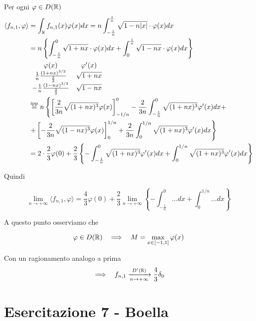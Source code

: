 \begin{enumerate}
Per ogni $\varphi \in D(\mathbb{R})$
\begin{align*}
\langle f_{n, 1}, \varphi \rangle & = \int_{\mathbb{R}} f_{n, 1}(x) \varphi (x) dx = n\int^{\frac{1}{n}}_{- \frac{1}{n}}\sqrt{1 - n| x|} \cdot \varphi (x) dx\\
 & = n\left\{\int^{0}_{- \frac{1}{n}}\sqrt{1 + nx} \cdot \varphi (x) dx + \int^{\frac{1}{n}}_{0}\sqrt{1 - nx} \cdot \varphi (x) dx\right\}\\
 &
\begin{array}{c c}
\varphi (x) & \varphi '(x)\\
\frac{1}{n}\frac{(1 + nx)^{3/2}}{\frac{3}{2}} & \sqrt{1 + nx}\\
- \frac{1}{n}\frac{(1 - nx)^{3/2}}{\frac{3}{2}} & \sqrt{1 - nx}
\end{array}\\
 & \overset{\text{ipp}}{=} n\left\{\left[\frac{2}{3n}\sqrt{(1 + nx)^{3}} \varphi (x)\right]^{0}_{- 1/n} - \frac{2}{3n}\int^{0}_{- \frac{1}{n}}\sqrt{(1 + nx)^{3}} \varphi '(x)dx + \right. \\
 & \left. + \left[ - \frac{2}{3n}\sqrt{(1 - nx)^{3}} \varphi (x)\right]^{1/n}_{0} + \frac{2}{3n}\int^{1/n}_{0}\sqrt{(1 + nx)^{3}} \varphi '(x)dx\right\}\\
 & = 2 \cdot \frac{2}{3} \varphi (0) + \frac{2}{3}\left\{- \int^{0}_{- \frac{1}{n}}\sqrt{(1 + nx)^{3}} \varphi '(x)dx + \int^{1/n}_{0}\sqrt{(1 + nx)^{3}} \varphi '(x)dx\right\}
\end{align*}

Quindi

\begin{equation*}
\lim\limits_{n\rightarrow + \infty} \langle f_{n, 1}, \varphi \rangle = \frac{4}{3} \varphi (0) + \frac{2}{3}\lim\limits_{n\rightarrow + \infty}\left\{- \int^{0}_{- \frac{1}{n}} \dotsc dx + \int^{1/n}_{0} \dotsc dx\right\}
\end{equation*}

A questo punto osserviamo che

\begin{equation*}
\varphi \in D(\mathbb{R}) \ \ \implies \ \ M = \max_{x\in [ - 1, 1]} \varphi (x)
\end{equation*}

Con un ragionamento analogo a prima
\begin{equation*}
\implies \ \ f_{n, 1}\xrightarrow[n\rightarrow + \infty ]{D'(\mathbb{R})}\frac{4}{3} \delta_{0}
\end{equation*}
\end{enumerate}
\chapter{Esercitazione 7 - Boella}
\ParteEsercizi
\Esercizio{}

